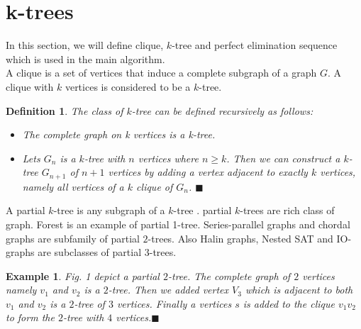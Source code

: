 \documentclass[12pt]{article}
\newtheorem*{defi}{Definition}
\newtheorem{exmp}{Example}[section]
\begin{document}
\section{k-trees}
\label{sec:ktree}
In this section, we will define clique, $k$-tree and perfect elimination sequence which is used in the main algorithm.\\
A clique is a set of vertices that induce a complete subgraph of a graph \(G\). A clique with \(k\) vertices is considered to be a \(k\)-tree.%
\begin{defi}
\normalfont
The class of  \(k\)-tree can be  defined recursively as follows: 
\begin{itemize}[noitemsep,nolistsep]
 \item The complete graph on k vertices is a k-tree.
 \item Lets \(G_n\) is a \(k\)-tree  with $n$ vertices where $n\geq k$. Then we can construct a $k$-tree $G_{n+1}$ of $n+1$ vertices by adding a vertex adjacent to exactly $k$ vertices, namely all vertices of a $k$ clique of $G_n$. $\blacksquare$
\end{itemize}

\end{defi}
  A partial \(k\)-tree is any subgraph of a \(k\)-tree . partial \(k\)-trees are rich class of graph. Forest is an example of partial 1-tree. Series-parallel graphs and chordal graphs are subfamily of partial \(2\)-trees. Also Halin graphs, Nested SAT and IO-graphs are subclasses of partial \(3\)-trees.
  

  \begin{exmp}
  \normalfont
  Fig. 1 depict a partial $2$-tree. The complete graph of $2$ vertices namely $v_1$ and $v_2$ is a $2$-tree. Then we added vertex $V_3$ which is adjacent to both $v_1$ and $v_2$ is a $2$-tree of $3$ vertices. Finally a vertices $s$ is added to the clique $v_1v_2$ to form the $2$-tree with $4$ vertices.$\blacksquare$
  \end{exmp}
\end{document}
